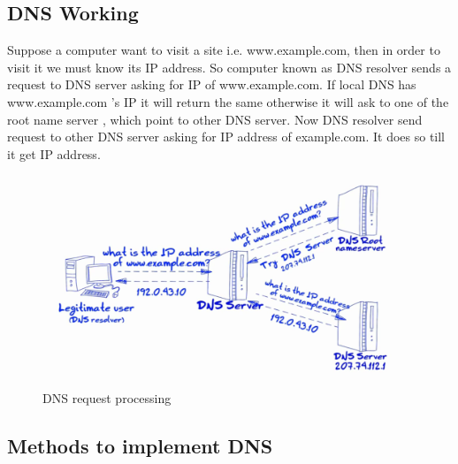 \documentclass[11pt]{article}
\begin{document}
\subsection{DNS Working}
Suppose a computer want to visit a site i.e. www.example.com, then in order to visit it we must know its IP address. So computer known as DNS resolver sends a request to DNS server asking for IP of www.example.com. If local DNS has www.example.com 's IP it will return the same otherwise it will ask to one of the root name server , which point to other DNS server. Now DNS resolver send request to other DNS server asking for IP address of example.com. It does so till it get IP address. 
\begin{figure}[H]
\includegraphics[scale=0.4]{dns.png}
\caption{DNS request processing}
\end{figure}

\subsection{Methods to implement DNS}
\end{document}
